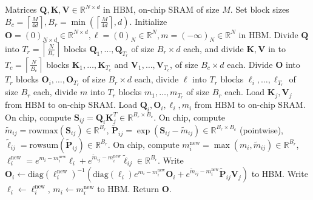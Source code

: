 \documentclass{article}
\newcommand{\diag}{\mathrm{diag}}
\newcommand{\vQ}{\mathbf{Q}}
\newcommand{\vK}{\mathbf{K}}
\newcommand{\vV}{\mathbf{V}}
\newcommand{\vS}{\mathbf{S}}
\newcommand{\vP}{\mathbf{P}}
\newcommand{\vO}{\mathbf{O}}
\newcommand{\sysname}{\textsc{FlashAttention}\xspace}
\begin{document}
\vspace{-0.5em}
\begin{algorithm}[H]
  \iftoggle{icmlworkshop}{
  \small
  }{}
  \caption{\small\label{alg:stream_attn}\sysname}
  \begin{algorithmic}[1]
    \REQUIRE Matrices $\vQ, \vK, \vV \in \mathbb{R}^{N \times d}$ in HBM, on-chip SRAM of
    size $M$.
    \STATE Set block sizes $B_c = \left\lceil \frac{M}{4d} \right\rceil, B_r = \min \left( \left\lceil \frac{M}{4d} \right\rceil , d \right)$.
    \STATE \label{alg:stream_attn_init} Initialize $\vO = (0)_{N \times d} \in \mathbb{R}^{N \times d}, \ell = (0)_N \in \mathbb{R}^{N}, m = (-\infty)_N \in \mathbb{R}^{N}$ in HBM.
    \STATE \label{alg:stream_attn_split_qkv} Divide $\vQ$ into $T_r = \left\lceil\frac{N}{B_r} \right\rceil$ blocks $\vQ_1, \dots, \vQ_{T_r}$ of size $B_r \times d$ each,
    and divide $\vK, \vV$ in to $T_c = \left\lceil \frac{N}{B_c} \right\rceil$ blocks $\vK_1, \dots, \vK_{T_c}$ and
    $\vV_1, \dots, \vV_{T_c}$, of size $B_c \times d$ each.
    \STATE Divide $\vO$ into $T_r$ blocks $\vO_i, \dots, \vO_{T_r}$ of size
    $B_r \times d$ each, divide $\ell$ into $T_r$ blocks $\ell_i, \dots, \ell_{T_r}$ of size
    $B_r$ each, divide $m$ into $T_r$ blocks $m_1, \dots, m_{T_r}$ of size $B_r$ each.
     \label{alg:stream_attn_outer_loop}
      \STATE \label{alg:stream_attn_load_kv} Load $\vK_j, \vV_j$ from HBM to on-chip SRAM.
        \STATE \label{alg:stream_attn_load_qo} Load $\vQ_i, \vO_i, \ell_i, m_i$ from HBM to on-chip SRAM.
        \STATE \label{alg:stream_attn_qk} On chip, compute $\vS_{ij} = \vQ_i \vK_j^T \in \mathbb{R}^{B_r \times B_c}$.
        \STATE \label{alg:stream_attn_statistics} On chip, compute $\tilde{m}_{ij} = \mathrm{rowmax}(\vS_{ij}) \in \mathbb{R}^{B_r}$, $\tilde{\vP}_{ij} = \exp(\vS_{ij} - \tilde{m}_{ij}) \in \mathbb{R}^{B_r \times B_c}$ (pointwise),
        $\tilde{\ell}_{ij} = \mathrm{row sum}(\tilde{\vP}_{ij}) \in \mathbb{R}^{B_r}$.
        \STATE On chip, compute $m_i^{\mathrm{new}} = \max(m_i, \tilde{m}_{ij}) \in \mathbb{R}^{B_r}$, $\ell_i^{\mathrm{new}} = e^{m_i - m_i^{\mathrm{new}}} \ell_i + e^{\tilde{m}_{ij} - m_i^{\mathrm{new}}} \tilde{\ell}_{ij} \in \mathbb{R}^{B_r}$.
        \STATE \label{alg:stream_attn_aggregate} Write $\vO_i \leftarrow \diag(\ell_i^{\mathrm{new}})^{-1}(\diag(\ell_i) e^{m_i - m_i^{\mathrm{new}}} \vO_i + e^{\tilde{m}_{ij} - m_i^{\mathrm{new}}}\tilde{\vP}_{ij} \vV_j)$
        to HBM.
        \STATE Write $\ell_i \leftarrow \ell_i^{\mathrm{new}}$, $m_i \leftarrow m_i^{\mathrm{new}}$ to HBM.
      \ENDFOR
    \ENDFOR
    \STATE Return $\vO$.
  \end{algorithmic}
\end{algorithm}
\vspace{-0.5em}
\end{document}
